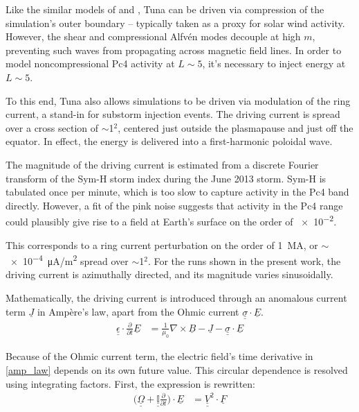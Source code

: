 \documentclass{article}
\newcommand{\about}{\ensuremath{\sim}}
\newcommand{\Alfven}{Alfv\'en\xspace}
\newcommand{\Ampere}{Amp\`ere\xspace}
\renewcommand{\vec}[1]{\ensuremath{\underline{#1}}}
\newcommand{\tensor}[1]{\ensuremath{\underline{\underline{#1}}}}
\newcommand{\dd}[1]{\ensuremath{ \frac{\partial}{\partial #1} }\xspace}
\newcommand{\ddt}{\dd{t}\xspace}
\newcommand{\curl}[1]{\ensuremath{ \nabla \times \vec{#1} }\xspace}
\newcommand{\azm}{\ensuremath{m}\xspace}
\newcommand{\mz}{\ensuremath{\mu_0}\xspace}
\newcommand{\oomz}{\ensuremath{ \frac{1}{\mz} }\xspace}
\begin{document}
Like the similar models of \cite{lysak_2013} and \cite{waters_2013},
Tuna can be driven via compression of the simulation's outer boundary --
typically taken as a proxy for solar wind activity. However, the shear
and compressional \Alfven modes decouple at high \azm, preventing such
waves from propagating across magnetic field lines. In order to model
noncompressional Pc4 activity at $L\about5$, it's necessary to inject
energy at $L\about5$.

To this end, Tuna also allows simulations to be driven via modulation of
the ring current, a stand-in for substorm injection events. The driving
current is spread over a cross section of \about\SI{1}{\RE}$^2$,
centered just outside the plasmapause and just off the equator. In
effect, the energy is delivered into a first-harmonic poloidal wave.

The magnitude of the driving current is estimated from a discrete
Fourier transform of the Sym-H storm index during the June 2013 storm.
Sym-H is tabulated once per minute, which is too slow to capture
activity in the Pc4 band directly. However, a fit of the pink noise
suggests that activity in the Pc4 range could plausibly give rise to a
field at Earth's surface on the order of \SI{e-2}{\nT}.

This corresponds to a ring current perturbation on the order of
\SI{1}{\mega\A}, or \about\SI{e-4}{\uA/\m\squared} spread over
\about\SI{1}{\RE}$^2$. For the runs shown in the present work, the
driving current is azimuthally directed, and its magnitude varies
sinusoidally.


Mathematically, the driving current is introduced through an anomalous
current term $\vec{J}$ in \Ampere's law, apart from the Ohmic current
${\tensor{\sigma} \cdot \vec{E}}$.
\begin{align}
    \label{amp_law}
    \tensor{\epsilon} \cdot \ddt \vec{E} &= \oomz \curl{B} - \vec{J}
      - \tensor{\sigma} \cdot \vec{E}
\end{align}

Because of the Ohmic current term, the electric field's time derivative
in \cref{amp_law} depends on its own future value. This circular
dependence is resolved using integrating factors. First, the expression
is rewritten:
\begin{align}
    \label{int_fac}
    \Big( \tensor{\Omega} + \tensor{ \mathbb{I} }\ddt \Big) \cdot
        \vec{E} &= \tensor{V}^2 \cdot \vec{F}
\end{align}
\end{document}
